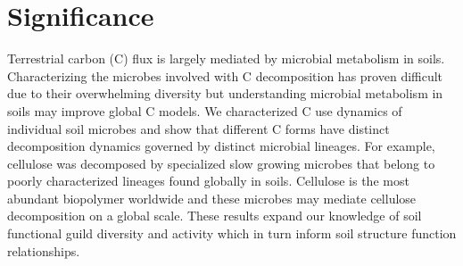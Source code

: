 \section{Significance} Terrestrial carbon (C) flux is largely mediated by
microbial metabolism in soils. Characterizing the microbes involved with
C decomposition has proven difficult due to their overwhelming diversity but
understanding microbial metabolism in soils may improve global C models. We
characterized C use dynamics of individual soil microbes and show that
different C forms have distinct decomposition dynamics governed by distinct
microbial lineages. For example, cellulose was decomposed by specialized slow
growing microbes that belong to poorly characterized lineages found globally in
soils. Cellulose is the most abundant biopolymer worldwide and these microbes
may mediate cellulose decomposition on a global scale. These results expand our
knowledge of soil functional guild diversity and activity which in turn inform
soil structure function relationships.

